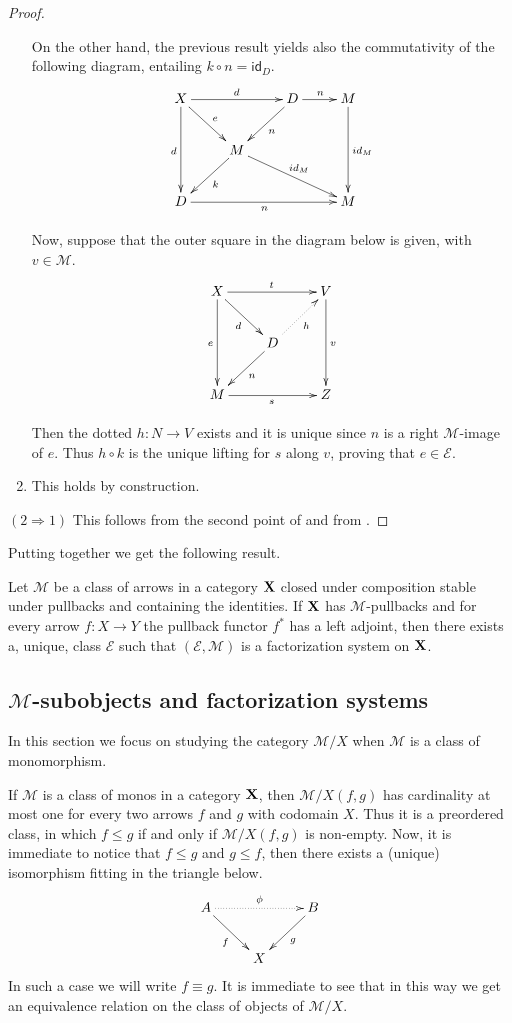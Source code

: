 \documentclass[a4paper,UKenglish,cleveref,pdftex,thm-restate,numberwithinsect]{lipics-v2021}
\newcommand{\id}[1]{\mathsf{id}_{#1}}
\def\D{\textbf {\textup{D}}}
\def\X{\textbf {\textup{X}}}
\begin{document}
\begin{proof}
\begin{enumerate}
		On the other hand, the previous result yields also the commutativity of the following diagram, entailing $k\circ n=\id{D}$.
		\[\xymatrix{X \ar[rr]^{d} \ar[dr]^{e}\ar[dd]_{d}& &D \ar[r]^{n}\ar[dl]^{n}& M \ar[dd]^{\id{M}}\\ & M\ar[dl]^{k} \ar[drr]^{\id{M}}\\D\ar[rrr]_{n}&&&M}\]
		
		Now, suppose that the outer square in the diagram below is given, with $v\in \mathcal{M}$.
		\[\xymatrix{X \ar[dd]_{e} \ar[dr]_{d}\ar[rr]^{t}&& V \ar[dd]^{v}\\ & D \ar[dl]^{n} \ar@{.>}[ur]_{h}\\M \ar[rr]_{s}&& Z}\]
		
		Then the dotted $h\colon N\to V$ exists and it is unique since $n$ is a right $\mathcal{M}$-image of  $e$. Thus $h\circ k$ is the unique lifting for $s$ along $v$, proving that $e\in \mathcal{E}$.
		\item This holds by construction.
	\end{enumerate}
	
	\smallskip \noindent $(2\Rightarrow 1)$  This follows from the second point of  and from . \qedhere  
\end{proof}

Putting together  we get the following result.

\begin{corollary}\label{cor:fact}
	Let $\mathcal{M}$ be a class of arrows in a category $\X$ closed under composition stable under pullbacks and containing the identities. If $\X$ has $\mathcal{M}$-pullbacks and for every arrow $f\colon X\to Y$ the pullback functor $f^*$ has a left adjoint, then there exists a, unique, class $\mathcal{E}$ such that $(\mathcal{E}, \mathcal{M})$ is a factorization system on $\X$.
\end{corollary}

\subsection{$\mathcal{M}$-subobjects and factorization systems}

In this section we focus on studying the category $\mathcal{M}/X$ when $\mathcal{M}$ is a class of monomorphism.

\begin{remark}
	If  $\mathcal{M}$ is a class of monos in a category $\X$, then $\mathcal{M}/X(f,g)$ has cardinality at most one for every two arrows $f$ and $g$ with codomain $X$. Thus it is a preordered class, in which $f\leq g$ if and only if  $\mathcal{M}/X(f,g)$ is non-empty. Now, it is immediate to notice that $f\leq g$ and $g\leq f$, then there exists a (unique) isomorphism fitting in the triangle below.
	\[\xymatrix{A\ar@{.>}[rr]^{\phi} \ar[dr]_{f} && B \ar[dl]^{g}\\ & X}\]
	In such a case we will write $f\equiv g$. It is immediate to see that in this way we get an equivalence relation on the class of objects of $\mathcal{M}/X$.
\end{remark}
\end{document}
